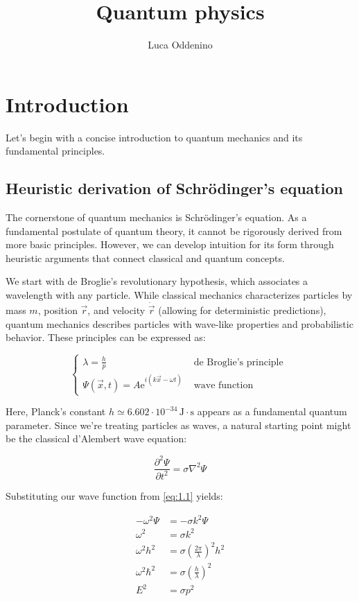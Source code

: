 \documentclass[italian]{HKNdocument}
\title{Quantum physics}
\author{Luca Oddenino}
\begin{document}
\section{Introduction}
Let's begin with a concise introduction to quantum mechanics and its fundamental principles.

\subsection{Heuristic derivation of Schrödinger's equation}
The cornerstone of quantum mechanics is Schrödinger's equation. As a fundamental postulate of quantum theory, it cannot be rigorously derived from more basic principles. However, we can develop intuition for its form through heuristic arguments that connect classical and quantum concepts.

We start with de Broglie's revolutionary hypothesis, which associates a wavelength with any particle. While classical mechanics characterizes particles by mass $m$, position $\vec{r}$, and velocity $\dot{\vec{r}}$ (allowing for deterministic predictions), quantum mechanics describes particles with wave-like properties and probabilistic behavior. These principles can be expressed as:

\[
\begin{cases}\lambda=\frac{h}{p} & \text { de Broglie's principle }  \label{eq:1.1}\\ \Psi(\vec{x}, t)=A \mathrm{e}^{i(k \vec{x}-\omega t)} & \text { wave function }\end{cases}
\]

Here, Planck's constant $h \simeq 6.602 \cdot 10^{-34} \, \mathrm{J} \cdot \mathrm{s}$ appears as a fundamental quantum parameter. Since we're treating particles as waves, a natural starting point might be the classical d'Alembert wave equation:

\begin{equation}
\frac{\partial^{2} \Psi}{\partial t^{2}}=\sigma \nabla^{2} \Psi
\end{equation}

Substituting our wave function from \eqref{eq:1.1} yields:

\begin{align}
-\omega^{2} \Psi & =-\sigma k^{2} \Psi \\
\omega^{2} & =\sigma k^{2} \\
\omega^{2} h^{2} & =\sigma\left(\frac{2 \pi}{\lambda}\right)^{2} h^{2}  \\
\omega^{2} \hbar^{2} & =\sigma\left(\frac{h}{\lambda}\right)^{2} \\
E^{2} & =\sigma p^{2}
\end{align}
\end{document}
